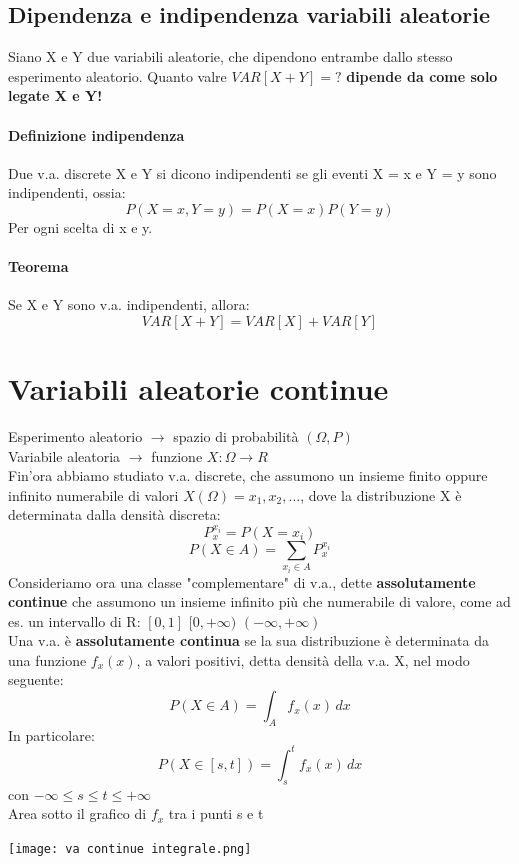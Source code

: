 \documentclass[12pt, a4paper, openany]{book}
\begin{document}
\subsection{Dipendenza e indipendenza variabili aleatorie}
Siano X e Y due variabili aleatorie, che dipendono entrambe dallo 
stesso esperimento aleatorio. Quanto valre $VAR[X+Y] = ?$
\textbf{dipende da come solo legate X e Y!}
\paragraph{Definizione indipendenza} Due v.a. discrete X e Y si dicono indipendenti
se gli eventi {X = x} e {Y = y} sono indipendenti, ossia:
\begin{equation*}
    P(X=x, Y=y) = P(X = x)P(Y = y)
\end{equation*}
Per ogni scelta di x e y.
\paragraph{Teorema} Se X e Y sono v.a. indipendenti, allora:
\begin{equation*}
    VAR[X+Y] = VAR[X] + VAR[Y]
\end{equation*}

\section{Variabili aleatorie continue}
Esperimento aleatorio $\to$ spazio di probabilità $(\Omega, P)$
\\ Variabile aleatoria $\to$ funzione $X:\Omega \to R$
\\Fin'ora abbiamo studiato v.a. discrete, che assumono un insieme finito oppure
infinito numerabile di valori $X(\Omega) = {x_1, x_2, \dots}$, dove la distribuzione
X è determinata dalla densità discreta:
\begin{equation*}
    P_x^{x_i} = P(X=x_i)
\end{equation*}
\begin{equation}
    P(X \in A) = \sum_{x_i \in A}P_x^{x_i}  
\end{equation}
Consideriamo ora una classe "complementare" di v.a., dette \textbf{assolutamente continue}
che assumono un insieme infinito più che numerabile di valore, come ad es. un intervallo
di R: $[0, 1]$ $[0, +\infty)$ $(-\infty, +\infty)$
\\ Una v.a. è \textbf{assolutamente continua} se la sua distribuzione è determinata
da una funzione $f_x(x)$, a valori positivi, detta densità della v.a. X, nel modo
seguente:
\begin{equation*}
    P(X \in A) = \int_{A}f_x (x) \,dx 
\end{equation*}
In particolare:
\begin{equation*}
    P(X\in[s,t]) = \int_{s}^{t} f_x (x)\,dx 
\end{equation*}
con $-\infty \leq s \leq t \leq +\infty$
\\Area sotto il grafico di $f_x$ tra i punti s e t
\begin{center}
    \texttt{[image: va continue integrale.png]}
\end{center}
\end{document}
